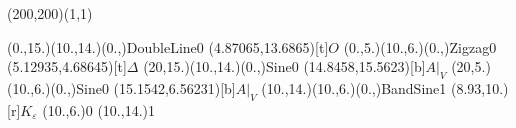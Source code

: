 \unitlength=1bp%

\begin{feynartspicture}(200,200)(1,1)

\FADiagram{}
\FAProp(0.,15.)(10.,14.)(0.,){DoubleLine}{0}
\FALabel(4.87065,13.6865)[t]{$O$}
\FAProp(0.,5.)(10.,6.)(0.,){Zigzag}{0}
\FALabel(5.12935,4.68645)[t]{$\Delta$}
\FAProp(20,15.)(10.,14.)(0.,){Sine}{0}
\FALabel(14.8458,15.5623)[b]{$A|_V$}
\FAProp(20,5.)(10.,6.)(0.,){Sine}{0}
\FALabel(15.1542,6.56231)[b]{$A|_V$}
\FAProp(10.,14.)(10.,6.)(0.,){BandSine}{1}
\FALabel(8.93,10.)[r]{$K_\varepsilon$}
\FAVert(10.,6.){0}
\FAVert(10.,14.){1}
\end{feynartspicture}

